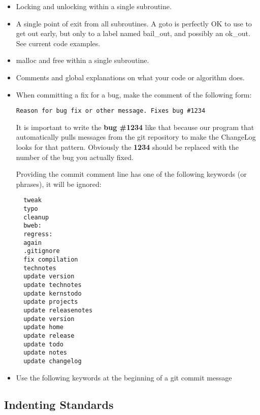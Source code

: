 \begin{itemize}
\item Locking and unlocking within a single subroutine.

\item A single point of exit from all subroutines. A goto is
     perfectly OK to use to get out early, but only to a label
     named bail\_out, and possibly an ok\_out.  See current code
     examples.

\item malloc and free within a single subroutine.

\item Comments and global explanations on what your code or  algorithm does.

\item When committing a fix for a bug, make the comment of the
following form:

\begin{verbatim}
Reason for bug fix or other message. Fixes bug #1234
\end{verbatim}

It is important to write the {\bf bug \#1234} like
that because our program that automatically pulls messages
from the git repository to make the ChangeLog looks for that
pattern.  Obviously the {\bf 1234} should be replaced with
the number of the bug you actually fixed.

Providing the commit comment line has one of the following
keywords (or phrases), it will be ignored:

\begin{verbatim}
  tweak
  typo
  cleanup
  bweb:
  regress:
  again
  .gitignore
  fix compilation
  technotes
  update version
  update technotes
  update kernstodo
  update projects
  update releasenotes
  update version
  update home
  update release
  update todo
  update notes
  update changelog
\end{verbatim}

\item Use the following keywords at the beginning of
a git commit message


\end{itemize}

\subsection{Indenting Standards}

